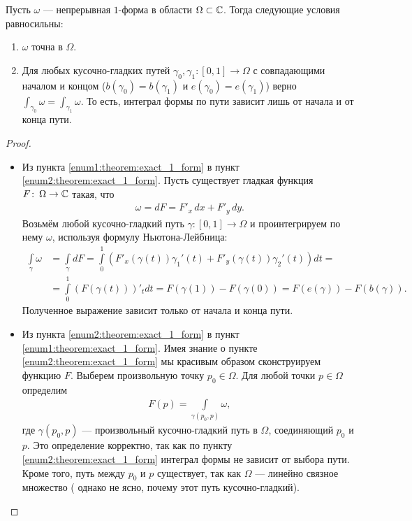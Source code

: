 \begin{thm}
 \label{theorem:exact_1_form}
 Пусть $\omega$ --- непрерывная $1$-форма в области $\Omega \subset \mathbb{C}$. Тогда следующие условия равносильны:
 \begin{enumerate}
  \item \label{enum1:theorem:exact_1_form} $\omega$ точна в $\Omega$.
  \item \label{enum2:theorem:exact_1_form} Для любых кусочно-гладких путей $\gamma_0, \gamma_1 \colon [0,1] \to \Omega$ с совпадающими началом и концом ($b(\gamma_0) = b(\gamma_1)$ и $e(\gamma_0) = e(\gamma_1)$) верно $ \int_{\gamma_0}  \omega = \int_{\gamma_1} \omega $. То есть, интеграл формы по пути зависит лишь от начала и от конца пути.
 \end{enumerate}
\end{thm}
\begin{proof}\
 \begin{itemize}
  \item Из пункта \ref{enum1:theorem:exact_1_form} в пункт \ref{enum2:theorem:exact_1_form}. Пусть существует гладкая функция $F \colon\,\Omega \to \mathbb{C}$ такая, что
   \begin{align*}
    \omega = d F = F'_x \, dx + F'_y \, dy
   .\end{align*} Возьмём любой кусочно-гладкий путь $\gamma \colon [0,1] \to \Omega$ и проинтегрируем по нему $\omega$, используя формулу Ньютона-Лейбница:
   \begin{align*}
    \int\limits_{\gamma} \omega &= \int\limits_{\gamma} dF = \int\limits_{0}^{1} \left( F'_x(\gamma(t)) \gamma_1'(t)  + F'_y(\gamma(t)) \gamma_2'(t) \right) dt = \\
    &= \int\limits_{0}^{1} \left( F(\gamma(t)) \right)'_t dt = F(\gamma(1)) - F(\gamma(0)) = F(e(\gamma)) - F(b(\gamma))
   .\end{align*} Полученное выражение зависит только от начала и конца пути.
  \item Из пункта \ref{enum2:theorem:exact_1_form} в пункт \ref{enum1:theorem:exact_1_form}. Имея знание о пункте \ref{enum2:theorem:exact_1_form} мы красивым образом сконструируем функцию $F$. Выберем произвольную точку $p_0 \in \Omega$. Для любой точки $p \in \Omega$ определим
   \begin{align*}
    F(p) = \int\limits_{\gamma(p_0,p)}  \omega
   ,\end{align*} где $\gamma(p_0,p)$ --- произвольный кусочно-гладкий путь в  $\Omega$, соединяющий $p_0$ и $p$. Это определение корректно, так как по пункту \ref{enum2:theorem:exact_1_form} интеграл формы не зависит от выбора пути. Кроме того, путь между $p_0$ и $p$ существует, так как $\Omega$ --- линейно связное множество ({\color{red} однако не ясно, почему этот путь кусочно-гладкий}).


\end{itemize}
\end{proof}
